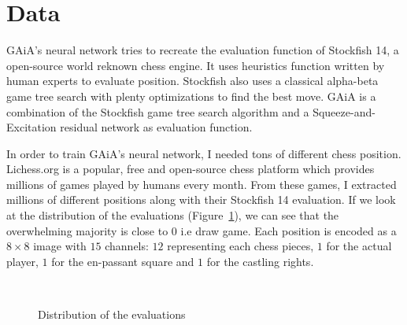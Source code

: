 \documentclass[unnumsec,webpdf,contemporary,large]{Article}%
\theoremstyle{thmstyleone}%
\theoremstyle{thmstyletwo}%
\theoremstyle{thmstylethree}%
\begin{document}
\section{Data}
GAiA's neural network tries to recreate the evaluation function of Stockfish 14\cite{stockfish},
a open-source world reknown chess engine. It uses heuristics function written
by human experts to evaluate position. Stockfish also uses a classical
alpha-beta game tree search with plenty optimizations to find the best move.
GAiA is a combination of the Stockfish game tree search algorithm and a
Squeeze-and-Excitation residual network as evaluation function.

In order to train GAiA's neural network, I needed tons of different
chess position. Lichess.org\cite{lichess} is a popular, free and open-source
chess platform which provides millions of games played by humans every month.
From these games, I extracted millions of different positions along with their
Stockfish 14 evaluation. If we look at the distribution of the evaluations
(Figure~\ref{fig:distribution}), we can see that the overwhelming majority
is close to $0$ i.e draw game.
Each position is encoded as a $8\times8$ image with $15$ channels: 
$12$ representing each chess pieces, $1$ for the actual player, $1$
for the en-passant square and $1$ for the castling rights.


\begin{figure}[H]
  \captionsetup[subfigure]{labelformat=empty}
  \centering
  \\
  \caption{Distribution of the evaluations}
  \label{fig:distribution}
\end{figure}
\end{document}
